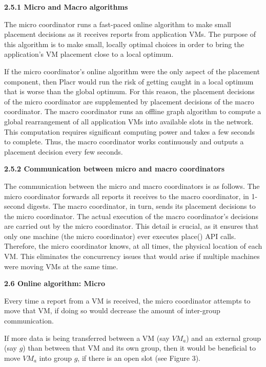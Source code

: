 \documentclass[11pt]{article}
\begin{document}
\large{\textbf{2.5.1 Micro and Macro algorithms}}

\normalsize

The micro coordinator runs a fast-paced online algorithm to make small placement decisions as it receives reports from application VMs.  The purpose of this algorithm is to make small, locally optimal choices in order to bring the application’s VM placement close to a local optimum.

If the micro coordinator’s online algorithm were the only aspect of the placement component, then Placr would run the risk of getting caught in a local optimum that is worse than the global optimum.  For this reason, the placement decisions of the micro coordinator are supplemented by placement decisions of the macro coordinator.  The macro coordinator runs an offline graph algorithm to compute a global rearrangement of all application VMs into available slots in the network.  This computation requires significant computing power and takes a few seconds to complete.  Thus, the macro coordinator works continuously and outputs a placement decision every few seconds.

\large{\textbf{2.5.2 Communication between micro and macro coordinators}}
\normalsize

The communication between the micro and macro coordinators is as follows.  The micro coordinator forwards all reports it receives to the macro coordinator, in 1-second digests.  The macro coordinator, in turn, sends its placement decisions to the micro coordinator.  The actual execution of the macro coordinator’s decisions are carried out by the micro coordinator.  This detail is crucial, as it ensures that only one machine (the micro coordinator) ever executes place() API calls.  Therefore, the micro coordinator knows, at all times, the physical location of each VM.  This eliminates the concurrency issues that would arise if multiple machines were moving VMs at the same time.

\Large{\textbf{2.6 Online algorithm: Micro }}

\normalsize

Every time a report from a VM is received, the micro coordinator attempts to move that VM, if doing so would decrease the amount of inter-group communication.

If more data is being transferred between a VM (say $VM_a$) and an external group (say $g$) than between that VM and its own group, then it would be beneficial to move $VM_a$ into group $g$, if there is an open slot (see Figure 3).
\end{document}

